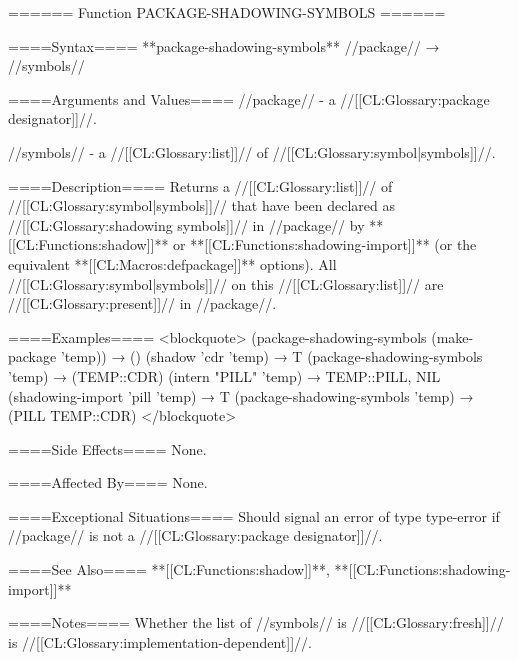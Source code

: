 ====== Function PACKAGE-SHADOWING-SYMBOLS ======

====Syntax====
**package-shadowing-symbols** //package// → //symbols//

====Arguments and Values====
//package// - a //[[CL:Glossary:package designator]]//.

//symbols// - a //[[CL:Glossary:list]]// of //[[CL:Glossary:symbol|symbols]]//.

====Description====
Returns a //[[CL:Glossary:list]]// of //[[CL:Glossary:symbol|symbols]]// that have been declared as //[[CL:Glossary:shadowing symbols]]// in //package// by **[[CL:Functions:shadow]]** or **[[CL:Functions:shadowing-import]]** (or the equivalent **[[CL:Macros:defpackage]]** options). All //[[CL:Glossary:symbol|symbols]]// on this //[[CL:Glossary:list]]// are //[[CL:Glossary:present]]// in //package//.

====Examples====
<blockquote> (package-shadowing-symbols (make-package 'temp)) → () (shadow 'cdr 'temp) → T (package-shadowing-symbols 'temp) → (TEMP::CDR) (intern "PILL" 'temp) → TEMP::PILL, NIL (shadowing-import 'pill 'temp) → T (package-shadowing-symbols 'temp) → (PILL TEMP::CDR) </blockquote>

====Side Effects====
None.

====Affected By====
None.

====Exceptional Situations====
Should signal an error of type type-error if //package// is not a //[[CL:Glossary:package designator]]//.

====See Also====
**[[CL:Functions:shadow]]**, **[[CL:Functions:shadowing-import]]**

====Notes====
Whether the list of //symbols// is //[[CL:Glossary:fresh]]// is //[[CL:Glossary:implementation-dependent]]//.

